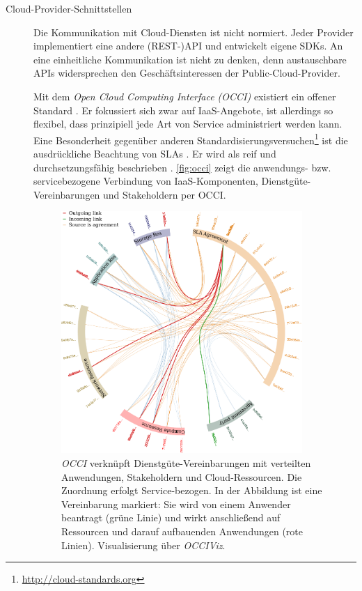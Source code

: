 \begin{description}
	\item[Cloud-Provider-Schnittstellen] Die Kommunikation mit Cloud-Diensten ist nicht normiert. Jeder Provider implementiert eine andere (REST-)API und entwickelt eigene SDKs. An eine einheitliche Kommunikation ist nicht zu denken, denn austauschbare APIs widersprechen den Geschäftsinteressen der Public-Cloud-Provider.
	
	Mit dem \emph{Open Cloud Computing Interface (OCCI)} existiert ein offener Standard \cite{ogf:2016:occi-core}. Er fokussiert sich zwar auf IaaS-Angebote, ist allerdings so flexibel, dass prinzipiell jede Art von Service administriert werden kann. Eine Besonderheit gegenüber anderen Standardisierungsversuchen\footnote{\url{http://cloud-standards.org}} ist die ausdrückliche Beachtung von SLAs \cite{ogf:2016:occi-sla}. Er wird als reif und durchsetzungsfähig beschrieben \cite{stanik:2016:sla-mediation}. 
	\autoref{fig:occi} zeigt die anwendungs- bzw. servicebezogene Verbindung von IaaS-Komponenten, Dienstgüte-Vereinbarungen und Stakeholdern per OCCI.
	
	\begin{figure}[ht]
		\centering
		\includegraphics[width=0.9\textwidth]{images/occi.pdf}
		\caption{\emph{OCCI} verknüpft Dienstgüte-Vereinbarungen mit verteilten Anwendungen, Stakeholdern und Cloud-Ressourcen. Die Zuordnung erfolgt Service-bezogen. In der Abbildung ist eine Vereinbarung markiert: Sie wird von einem Anwender beantragt (grüne Linie) und wirkt anschließend auf Ressourcen und darauf aufbauenden Anwendungen (rote Linien). Visualisierung über \emph{OCCIViz}\protect\footnotemark.}	
		\label{fig:occi}
	\end{figure}


\end{description}
